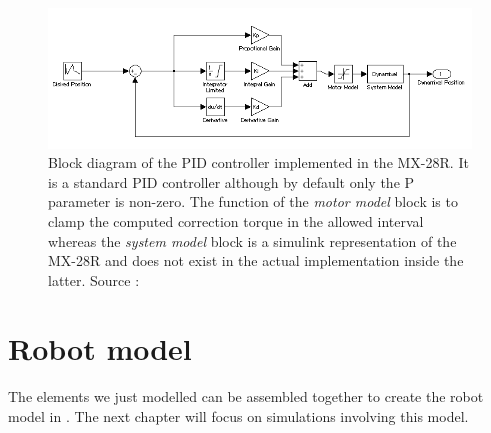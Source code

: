 \begin{figure}[htp]
\center
    \includegraphics[width = \textwidth]{figures/pidcontrol}
    \caption[MX-28 PID controller]{Block diagram of the PID controller implemented in the MX-28R. It is a standard PID controller although by default only the P parameter is non-zero. The function of the \textit{motor model} block is to clamp the computed correction torque in the allowed interval whereas the \emph{system model} block is a simulink representation of the MX-28R and does not exist in the actual implementation inside the latter. Source : \cite{mx_28_manual}}
    \label{fig:mx28_pid}
\end{figure}

\clearpage
\section{Robot model}
The elements we just modelled can be assembled together to create the robot model in . The next chapter will focus on simulations involving this model.
 
